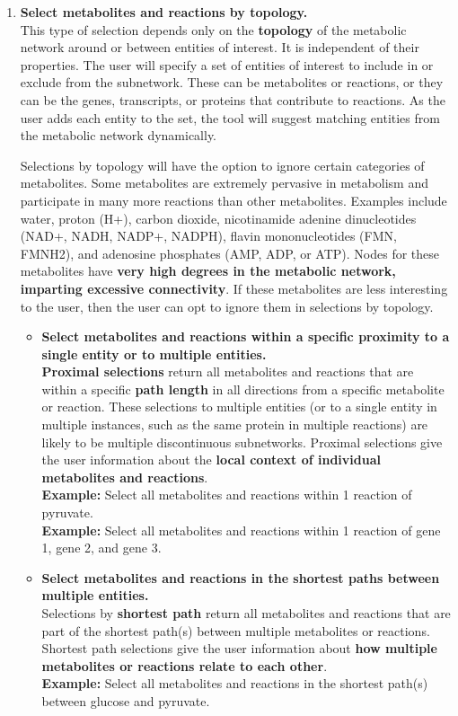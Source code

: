\begin{enumerate}

\item \textbf{Select metabolites and reactions by topology.}
\\ This type of selection depends only on the \textbf{topology} of the metabolic network around or between entities of interest.
It is independent of their properties.
The user will specify a set of entities of interest to include in or exclude from the subnetwork.
These can be metabolites or reactions, or they can be the genes, transcripts, or proteins that contribute to reactions.
As the user adds each entity to the set, the tool will suggest matching entities from the metabolic network dynamically.

Selections by topology will have the option to ignore certain categories of metabolites.
Some metabolites are extremely pervasive in metabolism and participate in many more reactions than other metabolites.
Examples include water, proton (H+), carbon dioxide, nicotinamide adenine dinucleotides (NAD+, NADH, NADP+, NADPH), flavin mononucleotides (FMN, FMNH2), and adenosine phosphates (AMP, ADP, or ATP).
Nodes for these metabolites have \textbf{very high degrees in the metabolic network, imparting excessive connectivity}.
If these metabolites are less interesting to the user, then the user can opt to ignore them in selections by topology.

\begin{itemize}

\item \textbf{Select metabolites and reactions within a specific proximity to a single entity or to multiple entities.}
\\ \textbf{Proximal selections} return all metabolites and reactions that are within a specific \textbf{path length} in all directions from a specific metabolite or reaction.
These selections to multiple entities (or to a single entity in multiple instances, such as the same protein in multiple reactions) are likely to be multiple discontinuous subnetworks.
Proximal selections give the user information about the \textbf{local context of individual metabolites and reactions}.
\\ \textbf{Example:} Select all metabolites and reactions within 1 reaction of pyruvate.
\\ \textbf{Example:} Select all metabolites and reactions within 1 reaction of gene 1, gene 2, and gene 3.

\item \textbf{Select metabolites and reactions in the shortest paths between multiple entities.}
\\ Selections by \textbf{shortest path} return all metabolites and reactions that are part of the shortest path(s) between multiple metabolites or reactions.
Shortest path selections give the user information about \textbf{how multiple metabolites or reactions relate to each other}.
\\ \textbf{Example:} Select all metabolites and reactions in the shortest path(s) between glucose and pyruvate.
\end{itemize}



\end{enumerate}
